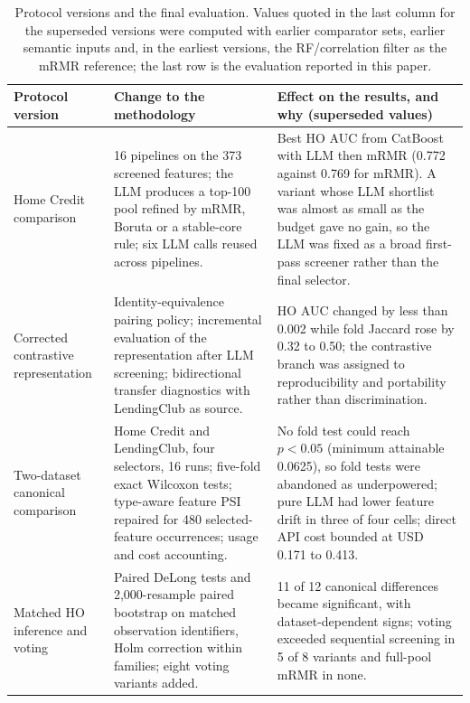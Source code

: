 \documentclass[final,5p,twocolumn]{elsarticle}
\begin{document}
\begin{table}[htbp]
\centering
\footnotesize
\setlength{\tabcolsep}{5pt}
\begin{threeparttable}
\caption{Protocol versions and the final evaluation. Values quoted in the last column for the superseded versions were computed with earlier comparator sets, earlier semantic inputs and, in the earliest versions, the RF/correlation filter as the mRMR reference; the last row is the evaluation reported in this paper.}
\label{tab:stages}
\begin{tabular}{@{}L{27mm}L{\dimexpr(\textwidth-27mm-4\tabcolsep)/2\relax}L{\dimexpr(\textwidth-27mm-4\tabcolsep)/2\relax}@{}}
\toprule
Protocol version & Change to the methodology & Effect on the results, and why (superseded values) \\
\midrule
Home Credit comparison & 16 pipelines on the 373 screened features; the LLM produces a top-100 pool refined by mRMR, Boruta or a stable-core rule; six LLM calls reused across pipelines. & Best HO AUC from CatBoost with LLM then mRMR (0.772 against 0.769 for mRMR). A variant whose LLM shortlist was almost as small as the budget gave no gain, so the LLM was fixed as a broad first-pass screener rather than the final selector. \\
\addlinespace
Corrected contrastive representation & Identity-equivalence pairing policy; incremental evaluation of the representation after LLM screening; bidirectional transfer diagnostics with LendingClub as source. & HO AUC changed by less than 0.002 while fold Jaccard rose by 0.32 to 0.50; the contrastive branch was assigned to reproducibility and portability rather than discrimination. \\
\addlinespace
Two-dataset canonical comparison & Home Credit and LendingClub, four selectors, 16 runs; five-fold exact Wilcoxon tests; type-aware feature PSI repaired for 480 selected-feature occurrences; usage and cost accounting. & No fold test could reach $p<0.05$ (minimum attainable 0.0625), so fold tests were abandoned as underpowered; pure LLM had lower feature drift in three of four cells; direct API cost bounded at USD 0.171 to 0.413. \\
\addlinespace
Matched HO inference and voting & Paired DeLong tests and 2,000-resample paired bootstrap on matched observation identifiers, Holm correction within families; eight voting variants added. & 11 of 12 canonical differences became significant, with dataset-dependent signs; voting exceeded sequential screening in 5 of 8 variants and full-pool mRMR in none. \\

\end{tabular}
\end{threeparttable}
\end{table}
\end{document}
